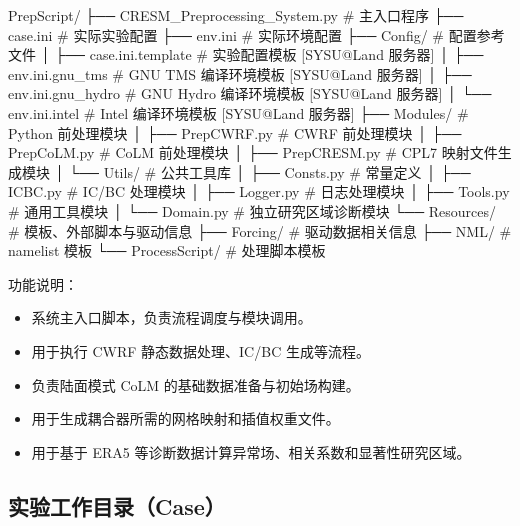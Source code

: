 \documentclass[UTF8,a4paper,11pt,fontset=none]{ctexart}
\begin{document}
\begin{CPSCode}[leftmargin=2em]
    PrepScript/
        ├── CRESM_Preprocessing_System.py   # 主入口程序
        ├── case.ini                        # 实际实验配置
        ├── env.ini                         # 实际环境配置
        ├── Config/                         # 配置参考文件
        │   ├── case.ini.template           # 实验配置模板 [SYSU@Land 服务器]
        │   ├── env.ini.gnu_tms             # GNU TMS 编译环境模板 [SYSU@Land 服务器]
        │   ├── env.ini.gnu_hydro           # GNU Hydro 编译环境模板 [SYSU@Land 服务器]
        │   └── env.ini.intel               # Intel 编译环境模板 [SYSU@Land 服务器]
        ├── Modules/                        # Python 前处理模块
        │   ├── PrepCWRF.py                 # CWRF 前处理模块
        │   ├── PrepCoLM.py                 # CoLM 前处理模块
        │   ├── PrepCRESM.py                # CPL7 映射文件生成模块
        │   └── Utils/                      # 公共工具库
        │       ├── Consts.py               # 常量定义
        │       ├── ICBC.py                 # IC/BC 处理模块
        │       ├── Logger.py               # 日志处理模块
        │       ├── Tools.py                # 通用工具模块
        │       └── Domain.py               # 独立研究区域诊断模块
        └── Resources/                      # 模板、外部脚本与驱动信息
            ├── Forcing/                    # 驱动数据相关信息
            ├── NML/                        # namelist 模板
            └── ProcessScript/              # 处理脚本模板
\end{CPSCode}

功能说明：

\begin{itemize} [leftmargin=4em]
    \item {} 系统主入口脚本，负责流程调度与模块调用。
    \item {} 用于执行 CWRF 静态数据处理、IC/BC 生成等流程。
    \item {} 负责陆面模式 CoLM 的基础数据准备与初始场构建。
    \item {} 用于生成耦合器所需的网格映射和插值权重文件。
    \item {} 用于基于 ERA5 等诊断数据计算异常场、相关系数和显著性研究区域。
\end{itemize}

\subsection{实验工作目录（Case）}
\end{document}
